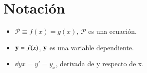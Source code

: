 
\chapter{Notación}
\begin{multicols}{2}
    \begin{itemize}
        \item $ \mathcal{P} \equiv f(x) = g(x)$, $\mathcal{P}$ es una ecuación.
        \item $\mathbf{y} = f(x)$, $\mathbf{y}$ es una variable dependiente.
        \item $\dd{y}{x} = y' = y_x$, derivada de y respecto de x.
    \end{itemize}
\end{multicols}
